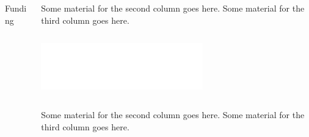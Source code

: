 \documentclass{beamer}
\begin{document}
\begin{frame}
\begin{columns}[t]
\begin{column}{.32\textwidth}
\begin{block}{Funding}
\end{block}




\end{column}


\begin{column}{.65\textwidth}
\vspace*{-\baselineskip}
  \begin{columns}[t,totalwidth=\textwidth]
    Some material for the second column goes here.
    Some material for the third column goes here.
  \end{columns}
  \includegraphics[width=\textwidth,height=2cm]{bcca_logo.pdf}
  \begin{columns}[t,totalwidth=\textwidth]
    Some material for the second column goes here.
    Some material for the third column goes here.
  \end{columns}
\end{column}


\end{columns}

\end{frame}
\end{document}
